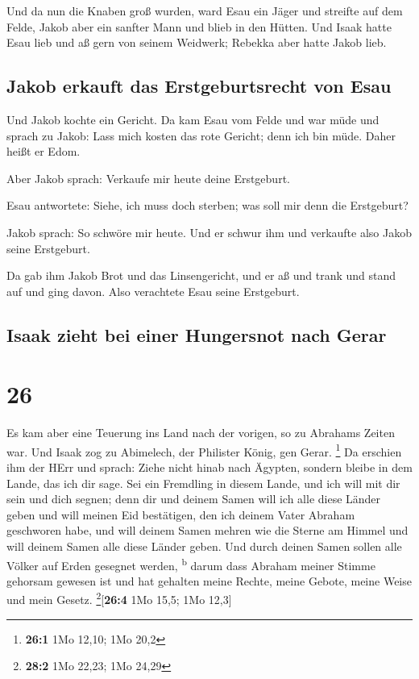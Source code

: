  Und da nun die Knaben groß wurden, ward Esau ein Jäger
und streifte auf dem Felde, Jakob aber ein sanfter Mann und blieb in den
Hütten.  Und Isaak hatte Esau lieb und aß gern von seinem
Weidwerk; Rebekka aber hatte Jakob lieb.

\hypertarget{jakob-erkauft-das-erstgeburtsrecht-von-esau}{%
\subsection{Jakob erkauft das Erstgeburtsrecht von
Esau}\label{jakob-erkauft-das-erstgeburtsrecht-von-esau}}

 Und Jakob kochte ein Gericht. Da kam Esau vom Felde und
war müde  und sprach zu Jakob: Lass mich kosten das rote
Gericht; denn ich bin müde. Daher heißt er Edom.

 Aber Jakob sprach: Verkaufe mir heute deine Erstgeburt.

 Esau antwortete: Siehe, ich muss doch sterben; was soll
mir denn die Erstgeburt?

 Jakob sprach: So schwöre mir heute. Und er schwur ihm
und verkaufte also Jakob seine Erstgeburt.

 Da gab ihm Jakob Brot und das Linsengericht, und er aß
und trank und stand auf und ging davon. Also verachtete Esau seine
Erstgeburt.

\hypertarget{isaak-zieht-bei-einer-hungersnot-nach-gerar}{%
\subsection{Isaak zieht bei einer Hungersnot nach
Gerar}\label{isaak-zieht-bei-einer-hungersnot-nach-gerar}}

\hypertarget{section-25}{%
\section{26}\label{section-25}}

 Es kam aber eine Teuerung ins Land nach der vorigen, so
zu Abrahams Zeiten war. Und Isaak zog zu Abimelech, der Philister König,
gen Gerar. \footnote{\textbf{26:1} 1Mo 12,10; 1Mo 20,2} 
Da erschien ihm der HErr und sprach: Ziehe nicht hinab nach Ägypten,
sondern bleibe in dem Lande, das ich dir sage.  Sei ein
Fremdling in diesem Lande, und ich will mit dir sein und dich segnen;
denn dir und deinem Samen will ich alle diese Länder geben und will
meinen Eid bestätigen, den ich deinem Vater Abraham geschworen habe,
 und will deinem Samen mehren wie die Sterne am Himmel und
will deinem Samen alle diese Länder geben. Und durch deinen Samen sollen
alle Völker auf Erden gesegnet werden, \textsuperscript{b}
 darum dass Abraham meiner Stimme gehorsam gewesen ist und
hat gehalten meine Rechte, meine Gebote, meine Weise und mein Gesetz.
\footnote{\textbf{28:2} 1Mo 22,23; 1Mo 24,29}{[}\textbf{26:4} 1Mo 15,5;
1Mo 12,3{]}

